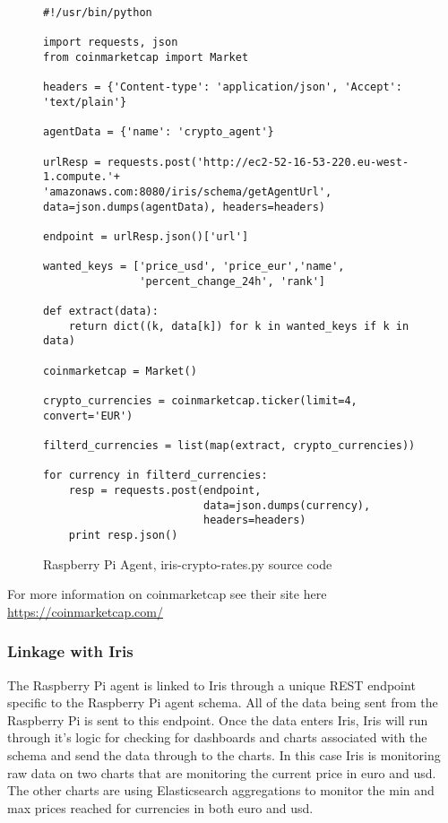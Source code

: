 \documentclass[12pt,a4paper,titlepage]{report}
\begin{document}
\begin{figure}[H]
\begin{tcolorbox}
\begin{verbatim}
#!/usr/bin/python

import requests, json
from coinmarketcap import Market

headers = {'Content-type': 'application/json', 'Accept': 'text/plain'}

agentData = {'name': 'crypto_agent'}

urlResp = requests.post('http://ec2-52-16-53-220.eu-west-1.compute.'+
'amazonaws.com:8080/iris/schema/getAgentUrl', 
data=json.dumps(agentData), headers=headers)

endpoint = urlResp.json()['url']

wanted_keys = ['price_usd', 'price_eur','name', 
               'percent_change_24h', 'rank']

def extract(data):
    return dict((k, data[k]) for k in wanted_keys if k in data)

coinmarketcap = Market()

crypto_currencies = coinmarketcap.ticker(limit=4, convert='EUR')

filterd_currencies = list(map(extract, crypto_currencies))

for currency in filterd_currencies:
    resp = requests.post(endpoint, 
                         data=json.dumps(currency), 
                         headers=headers)
    print resp.json()
\end{verbatim}
\end{tcolorbox}
\caption{Raspberry Pi Agent, iris-crypto-rates.py source code}
\end{figure}

For more information on coinmarketcap see their site here \url{https://coinmarketcap.com/}

\subsubsection{Linkage with Iris}
The Raspberry Pi agent is linked to Iris through a unique REST endpoint specific to the Raspberry Pi agent schema. All of the data being sent from the Raspberry Pi is sent to this endpoint. Once the data enters Iris, Iris will run through it's logic for checking for dashboards and charts associated with the schema and send the data through to the charts. 
In this case Iris is monitoring raw data on two charts that are monitoring the current price in euro and usd. The other charts are using Elasticsearch aggregations to monitor the min and max prices reached for currencies in both euro and usd.
\end{document}
